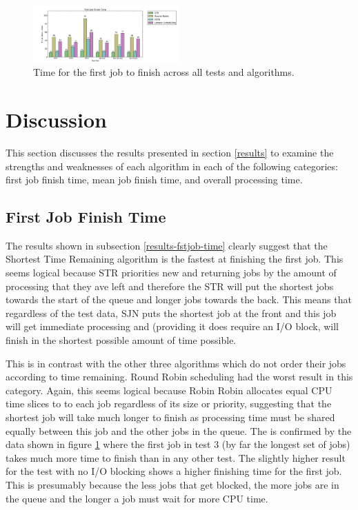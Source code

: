 \documentclass{acm_proc_article-sp}
\begin{document}
\begin{figure}[H]
\centering
\includegraphics[width=0.5\textwidth]{fstjob_time.png}
\caption{Time for the first job to finish across all tests and algorithms.}
\label{fig:fstjob-time}
\end{figure}

\section{Discussion}
This section discusses the results presented in section \ref{results} to examine the strengths and weaknesses of each algorithm in each of the following categories: first job finish time, mean job finish time, and overall processing time.

\subsection{First Job Finish Time}
The results shown in subsection \ref{results-fstjob-time} clearly suggest that the Shortest Time Remaining algorithm is the fastest at finishing the first job. This seems logical because STR priorities new and returning jobs by the amount of processing that they ave left and therefore the STR will put the shortest jobs towards the start of the queue and longer jobs towards the back. This means that regardless of the test data, SJN puts the shortest job at the front and this job will get immediate processing and (providing it does require an I/O block, will finish in the shortest possible amount of time possible.

This is in contrast with the other three algorithms which do not order their jobs according to time remaining. Round Robin scheduling had the worst result in this category. Again, this seems logical because Robin Robin allocates equal CPU time slices to to each job regardless of its size or priority, suggesting that the shortest job will take much longer to finish as processing time must be shared equally between this job and the other jobs in the queue. The is confirmed by the data shown in figure \ref{fig:fstjob-time} where the first job in test 3 (by far the longest set of jobs) takes much more time to finish than in any other test. The slightly higher result for the test with no I/O blocking shows a higher finishing time for the first job. This is presumably because the less jobs that get blocked, the more jobs are in the queue and the longer a job must wait for more CPU time.
\end{document}
